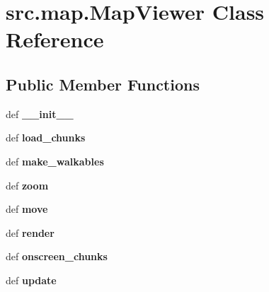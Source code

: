 \hypertarget{classsrc_1_1map_1_1_map_viewer}{\section{src.\-map.\-Map\-Viewer \-Class \-Reference}
\label{classsrc_1_1map_1_1_map_viewer}
}
\subsection*{\-Public \-Member \-Functions}
\begin{DoxyCompactItemize}
\item 
\hypertarget{classsrc_1_1map_1_1_map_viewer_a8997ec02710136f8bd6ebf59c63da281}{def {\bfseries \-\_\-\-\_\-init\-\_\-\-\_\-}}\label{classsrc_1_1map_1_1_map_viewer_a8997ec02710136f8bd6ebf59c63da281}

\item 
\hypertarget{classsrc_1_1map_1_1_map_viewer_a07a318fee6ef7bb30d191734e80a08ac}{def {\bfseries load\-\_\-chunks}}\label{classsrc_1_1map_1_1_map_viewer_a07a318fee6ef7bb30d191734e80a08ac}

\item 
\hypertarget{classsrc_1_1map_1_1_map_viewer_ac4f4367839d4e069c704342d75a5b763}{def {\bfseries make\-\_\-walkables}}\label{classsrc_1_1map_1_1_map_viewer_ac4f4367839d4e069c704342d75a5b763}

\item 
\hypertarget{classsrc_1_1map_1_1_map_viewer_a06296998c8b4ec64c1bfe1c5d16c0ca1}{def {\bfseries zoom}}\label{classsrc_1_1map_1_1_map_viewer_a06296998c8b4ec64c1bfe1c5d16c0ca1}

\item 
\hypertarget{classsrc_1_1map_1_1_map_viewer_ae8e7465bf22e8b6c624c57610d568091}{def {\bfseries move}}\label{classsrc_1_1map_1_1_map_viewer_ae8e7465bf22e8b6c624c57610d568091}

\item 
\hypertarget{classsrc_1_1map_1_1_map_viewer_a8b6327cbebaac59b59a07c8d48994f39}{def {\bfseries render}}\label{classsrc_1_1map_1_1_map_viewer_a8b6327cbebaac59b59a07c8d48994f39}

\item 
\hypertarget{classsrc_1_1map_1_1_map_viewer_a98ed63282992c7a07e1920ba58e54148}{def {\bfseries onscreen\-\_\-chunks}}\label{classsrc_1_1map_1_1_map_viewer_a98ed63282992c7a07e1920ba58e54148}

\item 
\hypertarget{classsrc_1_1map_1_1_map_viewer_a41a58673346c7d7dbe04fcb2e9b494e3}{def {\bfseries update}}\label{classsrc_1_1map_1_1_map_viewer_a41a58673346c7d7dbe04fcb2e9b494e3}


\end{DoxyCompactItemize}
